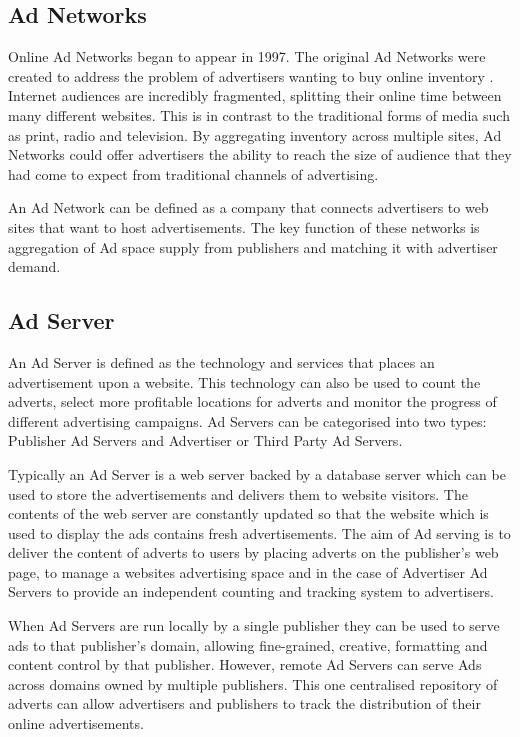 \documentclass[12pt]{article}
\begin{document}
\subsection{Ad Networks} \label{AdNetwork}
Online Ad Networks began to appear in 1997. The original Ad Networks were created to address the problem of advertisers wanting to buy online inventory \parencite{adExchanges}. Internet audiences are incredibly fragmented, splitting their online time between many different websites. This is in contrast to the traditional forms of media such as print, radio and television. By aggregating inventory across multiple sites, Ad Networks could offer advertisers the ability to reach the size of audience that they had come to expect from traditional channels of advertising. \newline

An Ad Network can be defined as a company that connects advertisers to web sites that want to host advertisements. The key function of these networks is aggregation of Ad space supply from publishers and matching it with advertiser demand. 

\subsection{Ad Server}
An Ad Server is defined as the technology and services that places an advertisement upon a website. This technology can also be used to count the adverts, select more profitable locations for adverts and monitor the progress of different advertising campaigns. Ad Servers can be categorised into two types: Publisher Ad Servers and Advertiser or Third Party Ad Servers. \newline 

Typically an Ad Server is a web server backed by a database server which can be used to store the advertisements and delivers them to website visitors. The contents of the web server are constantly updated so that the website which is used to display the ads contains fresh advertisements. The aim of Ad serving is to deliver the content of adverts to users by placing adverts on the publisher's web page, to manage a websites advertising space and in the case of Advertiser Ad Servers to provide an independent counting and tracking system to advertisers. \newline 

When Ad Servers are run locally by a single publisher they can be used to serve ads to that publisher's domain, allowing fine-grained, creative, formatting and content control by that publisher. However, remote Ad Servers can serve Ads across domains owned by multiple publishers. This one centralised repository of adverts can allow advertisers and publishers to track the distribution of their online advertisements. 
\end{document}
